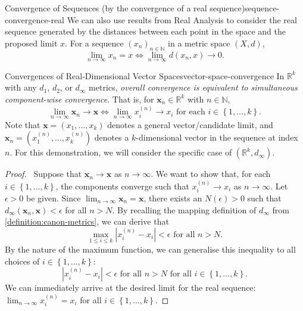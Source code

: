 \documentclass{article}
\renewcommand*\vec{\mathbf}
\newcommand*\iffforward{\par\boxed\Longrightarrow\ }
\numberwithin{equation}{section}
\numberwithin{figure}{section}
\begin{document}
\begin{definition}{Convergence of Sequences (by the convergence of a real
        sequence)}{sequence-convergence-real}
    We can also use results from Real Analysis to consider the real sequence
    generated by the distances between each point in the space and the proposed
    limit $ x $. For a sequence $ \left( x_n \right)_{n \in \mathbb{N}} $ in a
    metric space $ (X, d) $,
    \begin{equation}
        \lim_{n \to \infty} x_n = x \iff \lim_{n \to \infty} d(x_n, x) \to 0.
    \end{equation}
\end{definition}
\begin{theorem}{Convergences of Real-Dimensional Vector
        Spaces}{vector-space-convergence}
    In $ \mathbb{R}^k $ with any $ d_1 $, $ d_2 $, or $ d_\infty $ metrics,
    \emph{overall convergence is equivalent to simultaneous component-wise
    convergence}. That is, for $ \vec{x}_n \in \mathbb{R}^k $ with $ n \in
    \mathbb{N} $,
    \begin{equation}
        \lim_{n \to \infty} \vec{x}_n \to \vec{x} \iff
        \lim_{n \to \infty} x_i^{(n)} \to x_i \text{ for each } i \in \left\{1,
        \ldots, k \right\}.
    \end{equation}
    Note that $ \vec{x} = (x_1, \ldots, x_k) $ denotes a general
    vector/candidate limit, and $ \vec{x}_n = \left(x_1^{(n)}, \ldots,
    x_k^{(n)}\right) $ denotes a $ k $-dimensional vector in the sequence at
    index $ n $. For this demonstration, we will consider the specific case of
    $ \left(\mathbb{R}^k, d_\infty\right) $.
    \begin{proof}
        \iffforward Suppose that $ \vec{x}_n \to \vec{x} $ as $ n \to \infty $.
        We want to show that, for each $ i \in \left\{ 1, \ldots, k \right\} $,
        the components converge such that $ x_i^{(n)} \to x_i $ as $ n \to
        \infty $. Let $ \epsilon > 0 $ be given. Since $ \lim_{n \to \infty}
        \vec{x}_n = \vec{x} $, there exists an $ N(\epsilon) > 0 $ such that
        $ d_\infty(\vec{x}_n, \vec{x}) < \epsilon $ for all $ n > N $. By
        recalling the mapping definition of $ d_\infty $ from
        \cref{definition:canon-metrics}, we can derive that
        \begin{equation}
            \max_{1 \leq i \leq k} \left\vert x_i^{(n)} - x_i \right\vert <
            \epsilon \text{ for all } n > N.
        \end{equation}
        By the nature of the maximum function, we can generalise this inequality
        to all choices of $ i \in \left\{ 1, \ldots, k \right\} $:
        \begin{equation}
            \left\vert x_i^{(n)} - x_i \right\vert < \epsilon \text{ for all } n
            > N \text{ for all } i \in \left\{1, \ldots, k \right\}.
        \end{equation}
        We can immediately arrive at the desired limit for the real sequence: $
        \lim_{n \to \infty} x_i^{(n)} = x_i $ for all $ i \in \left\{ 1, \ldots,
        k \right\} $.


\end{proof}
\end{theorem}
\end{document}
